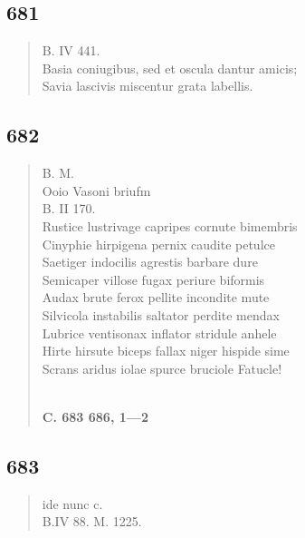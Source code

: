 \documentclass[11pt, a4paper]{report}
\begin{document}
            \subsection*{681}
      \begin{verse}
      B. IV 441. \\ Basia coniugibus, sed et oscula dantur amicis; \\ Savia lascivis miscentur grata labellis. \\ 
      \end{verse}
  
            \subsection*{682}
      \begin{verse}
      B. M. \\ Ooio Vasoni briufm \\ B. II 170. \\ Rustice lustrivage capripes cornute bimembris \\ Cinyphie hirpigena pernix caudite petulce \\ Saetiger indocilis agrestis barbare dure \\ Semicaper villose fugax periure biformis \\ Audax brute ferox pellite incondite mute \\ Silvicola instabilis saltator perdite mendax \\ Lubrice ventisonax inflator stridule anhele \\ Hirte hirsute biceps fallax niger hispide sime \\ Scrans aridus iolae spurce bruciole Fatucle! \\ 
        ﻿\pagebreak 
    \begin{center} \textbf{C. 683 686, 1—2} \end{center} \marginpar{[159]} 
      \end{verse}
  
            \subsection*{683}
      \begin{verse}
      ide nunc c. \\ B.IV 88. M. 1225. \\ 
      \end{verse}
  
\end{document}
